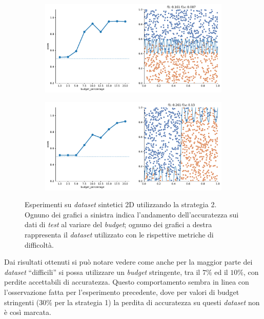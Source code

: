 \begin{figure}
\begin{subfigure}{.5\textwidth}
    \end{subfigure}%
    \hfill
    \begin{subfigure}{.5\textwidth}
        \centering
        \includegraphics[width=\textwidth]{img/2d_v2/14.pdf}
    \end{subfigure}
    \begin{subfigure}{.5\textwidth}
        \centering
        \includegraphics[width=\textwidth]{img/2d_v2/15.pdf}
    \end{subfigure}%
\caption[Risultati su \emph{dataset} sintetici utilizzando la strategia 2.]{Esperimenti su \emph{dataset} sintetici 2D utilizzando la strategia 2. Ognuno dei grafici a sinistra indica l'andamento dell'accuratezza sui dati di \emph{test} al variare del \emph{budget}; ognuno dei grafici a destra rappresenta il \emph{dataset} utilizzato con le rispettive metriche di difficoltà.}
\label{fig:2d_v2}
\end{figure}
Dai risultati ottenuti si può notare vedere come anche per la maggior parte dei \emph{dataset} ``difficili'' si possa utilizzare un \emph{budget} stringente, tra il $7\%$ ed il $10\%$, con perdite accettabili di accuratezza.
Questo comportamento sembra in linea con l'osservazione fatta per l'esperimento precedente, dove per valori di budget stringenti ($30\%$ per la strategia 1) la perdita di accuratezza su questi \emph{dataset} non è così marcata.

